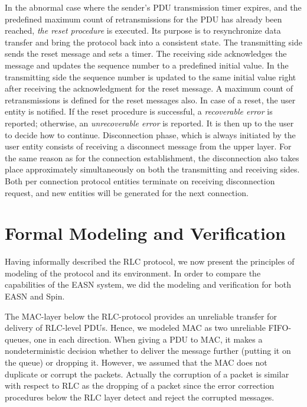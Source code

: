 \documentclass{entcs} \usepackage{entcsmacro}
\begin{document}
In the abnormal case where the sender's PDU transmission timer expires,
and the predefined maximum count of retransmissions for the PDU has already
been reached, {\em the reset procedure} is executed. Its purpose is to
resynchronize data transfer and bring the protocol back into a consistent
state. The transmitting side sends the reset message and sets a timer.
The receiving side acknowledges the message and updates the sequence
number to a predefined initial value. In the transmitting side the
sequence number is updated to the same initial value right after
receiving the acknowledgment for the reset message.
A maximum count of retransmissions is defined for the reset messages also.
In case of a reset, the user entity is notified. If the reset procedure is
successful, a {\em recoverable error} is reported; otherwise,
an {\em unrecoverable error} is reported. It is then up to the user to
decide how to continue.
Disconnection phase, which is always initiated by the user entity
consists of receiving a disconnect message from the upper layer.
For the same reason as for the connection establishment, the disconnection 
also takes place approximately simultaneously on both the transmitting and
receiving sides. Both per connection protocol entities terminate on receiving
disconnection request, and new entities will be generated for the next
connection.

%

\section{Formal Modeling and Verification}

Having informally described the RLC protocol, we now present 
the principles of modeling of the protocol and its environment.
In order to compare the capabilities of the EASN
system, we did the modeling and verification for both EASN and Spin. 

The MAC-layer below the RLC-protocol provides an unreliable transfer
for delivery of RLC-level PDUs. Hence, we modeled MAC as two unreliable
FIFO-queues, one in each direction. When giving a PDU to MAC, it makes
a nondeterministic decision whether to deliver the message further
(putting it on the queue) or dropping it. However, we assumed that the
MAC does not duplicate or corrupt the packets. Actually the corruption
of a packet is similar with respect to RLC as the dropping of a packet
since the error correction procedures below the RLC layer detect and
reject the corrupted messages.
\end{document}
